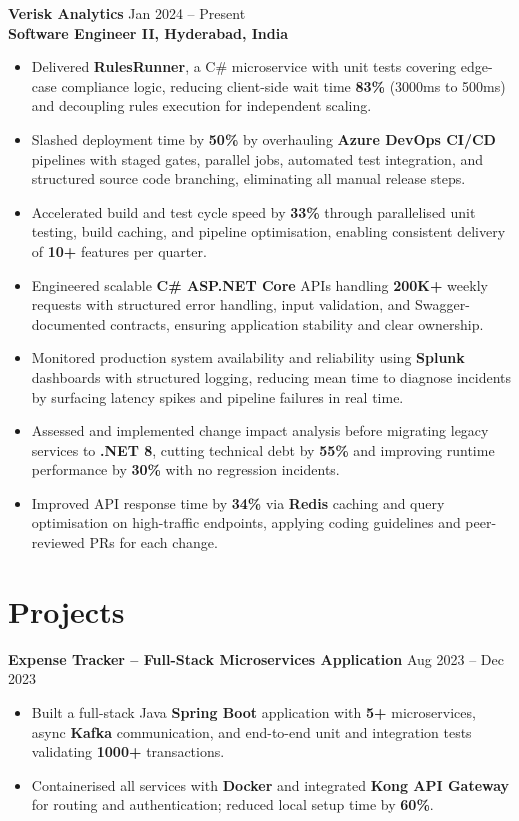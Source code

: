 \documentclass[letterpaper,10pt]{article}
\begin{document}
\textbf{Verisk Analytics} \hfill Jan 2024 -- Present \\
\textbf{Software Engineer II, Hyderabad, India}
\begin{itemize}[leftmargin=*]
    \item Delivered \textbf{RulesRunner}, a C\# microservice with unit tests covering edge-case compliance logic, reducing client-side wait time \textbf{83\%} (3000ms to 500ms) and decoupling rules execution for independent scaling.
    \item Slashed deployment time by \textbf{50\%} by overhauling \textbf{Azure DevOps CI/CD} pipelines with staged gates, parallel jobs, automated test integration, and structured source code branching, eliminating all manual release steps.
    \item Accelerated build and test cycle speed by \textbf{33\%} through parallelised unit testing, build caching, and pipeline optimisation, enabling consistent delivery of \textbf{10+} features per quarter.
    \item Engineered scalable \textbf{C\# ASP.NET Core} APIs handling \textbf{200K+} weekly requests with structured error handling, input validation, and Swagger-documented contracts, ensuring application stability and clear ownership.
    \item Monitored production system availability and reliability using \textbf{Splunk} dashboards with structured logging, reducing mean time to diagnose incidents by surfacing latency spikes and pipeline failures in real time.
    \item Assessed and implemented change impact analysis before migrating legacy services to \textbf{.NET 8}, cutting technical debt by \textbf{55\%} and improving runtime performance by \textbf{30\%} with no regression incidents.
    \item Improved API response time by \textbf{34\%} via \textbf{Redis} caching and query optimisation on high-traffic endpoints, applying coding guidelines and peer-reviewed PRs for each change.
\end{itemize}

\section*{Projects}

\textbf{Expense Tracker -- Full-Stack Microservices Application} \hfill Aug 2023 -- Dec 2023
\begin{itemize}[leftmargin=*]
    \item Built a full-stack Java \textbf{Spring Boot} application with \textbf{5+} microservices, async \textbf{Kafka} communication, and end-to-end unit and integration tests validating \textbf{1000+} transactions.
    \item Containerised all services with \textbf{Docker} and integrated \textbf{Kong API Gateway} for routing and authentication; reduced local setup time by \textbf{60\%}.
\end{itemize}
\end{document}
